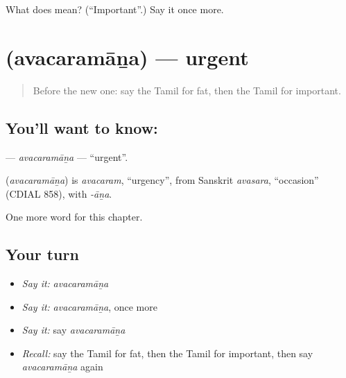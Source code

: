 \begin{tcolorbox}[breakable,colback=teal!4,colframe=teal!35!black,title={Before you move on}]
What does  mean? (\textquotedblleft{}Important\textquotedblright{}.) Say it once more.
\end{tcolorbox}
\section[\texorpdfstring{\ta{அவசரமான} (avacaramāṉa)}{அவசரமான (avacaramāṉa)}]{ (avacaramāṉa) — urgent}

\label{lesson:TA-C267-avacaramana}



\begin{quote}
Before the new one: say the Tamil for fat, then the Tamil for important.
\end{quote}

\subsection*{You'll want to know: }
\textbf{} — \emph{avacaramāṉa} — \textquotedblleft{}urgent\textquotedblright{}.

\begin{cousinweb}
\textbf{} (\emph{avacaramāṉa}) is \emph{avacaram}, \textquotedblleft{}urgency\textquotedblright{}, from Sanskrit \emph{avasara}, \textquotedblleft{}occasion\textquotedblright{} (CDIAL 858), with \emph{-āṉa}.
\end{cousinweb}

\begin{grammarlens}[title={What you've built}]
One more word for this chapter.
\end{grammarlens}

\subsection*{Your turn}
\begin{itemize}
\raggedright
  \item \emph{Say it:} \emph{avacaramāṉa}
  \item \emph{Say it:} \emph{avacaramāṉa}, once more
  \item \emph{Say it:} say \emph{avacaramāṉa}
  \item \emph{Recall:} say the Tamil for fat, then the Tamil for important, then say \emph{avacaramāṉa} again
\end{itemize}

